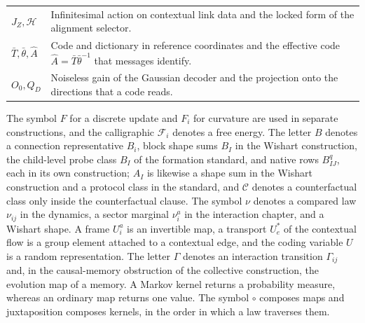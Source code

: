 \begin{longtable}{@{}p{}p{}@{}}
$J_Z,\mathcal H$ & Infinitesimal action on contextual link data and the locked form of the alignment selector. \\
$\bar T,\bar\theta,\hat A$ & Code and dictionary in reference coordinates and the effective code $\hat A=\bar T\bar\theta^{-1}$ that messages identify. \\
$O_0,Q_D$ & Noiseless gain of the Gaussian decoder and the projection onto the directions that a code reads. \\
\end{longtable}

The symbol $F$ for a discrete update and $F_i$ for curvature are used in separate constructions, and the calligraphic $\mathcal F_i$ denotes a free energy. The letter $B$ denotes a connection representative $B_i$, block shape sums $B_I$ in the Wishart construction, the child-level probe class $B_I$ of the formation standard, and native rows $B^q_{IJ}$, each in its own construction; $A_I$ is likewise a shape sum in the Wishart construction and a protocol class in the standard, and $\mathcal C$ denotes a counterfactual class only inside the counterfactual clause. The symbol $\nu$ denotes a compared law $\nu_{ij}$ in the dynamics, a sector marginal $\nu_i^a$ in the interaction chapter, and a Wishart shape. A frame $U_i^a$ is an invertible map, a transport $U_e^*$ of the contextual flow is a group element attached to a contextual edge, and the coding variable $U$ is a random representation. The letter $\Gamma$ denotes an interaction transition $\Gamma_{ij}$ and, in the causal-memory obstruction of the collective construction, the evolution map of a memory. A Markov kernel returns a probability measure, whereas an ordinary map returns one value. The symbol $\circ$ composes maps and juxtaposition composes kernels, in the order in which a law traverses them.
\endgroup
